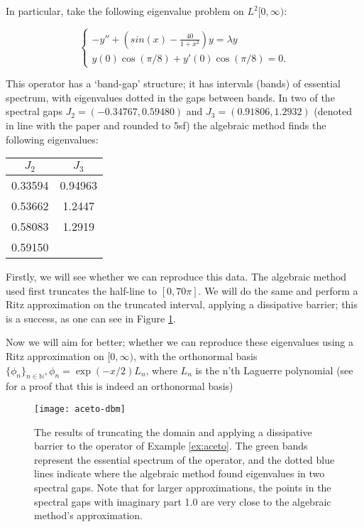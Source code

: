 \documentclass[../main.tex]{subfiles}
\begin{document}
\begin{example}\label{ex:aceto}
In particular, take the following eigenvalue problem on $L^2[0, \infty)$:

$$
\begin{cases}
-y'' + (sin(x) - \frac{40}{1+x^2})y = \lambda y \\
y(0) \cos(\pi/8) + y'(0) \cos(\pi/8) = 0.
\end{cases}
$$

This operator has a `band-gap' structure; it has intervals (bands) of essential spectrum, with eigenvalues dotted in the gaps between bands.
In two of the spectral gaps $J_2 = (-0.34767, 0.59480)$ and $J_3 = (0.91806, 1.2932)$ (denoted in line with the paper and rounded to 5sf) the
algebraic method finds the following eigenvalues:

\begin{figure*}[h!]
\centering
\begin{tabular}{c c}
$J_2$ & $J_3$ \\
\hline\hline
0.33594 & 0.94963 \\
0.53662 & 1.2447 \\
0.58083 & 1.2919 \\
0.59150 & \\
\end{tabular}
\end{figure*}

Firstly, we will see whether we can reproduce this data. The algebraic method used first truncates the half-line to $[0, 70\pi]$. We will do the same and
perform a Ritz approximation on the truncated interval, applying a dissipative barrier; this is a success, as one can see in Figure \ref{fig:aceto-dbm}.

Now we will aim for better; whether we can reproduce these eigenvalues using a Ritz approximation on $[0, \infty)$, with the orthonormal basis $\{\phi_n\}_{n \in \mathbb{N}},
\phi_n = \exp(-x/2)L_n$, where $L_n$ is the n'th Laguerre polynomial (see \cite{szego1975orthogonal} for a proof that this is indeed an orthonormal basis)
\end{example}

\begin{figure}[p!]
\texttt{[image: aceto-dbm]}
\caption{The results of truncating the domain and applying a dissipative barrier to the operator of Example \ref{ex:aceto}.
The green bands represent the essential spectrum of the operator, and the dotted blue lines indicate where the algebraic method found
eigenvalues in two spectral gaps. Note that for larger approximations, the points in the spectral gaps with imaginary part 1.0 are
very close to the algebraic method's approximation.}
\label{fig:aceto-dbm}
\end{figure}
\end{document}
